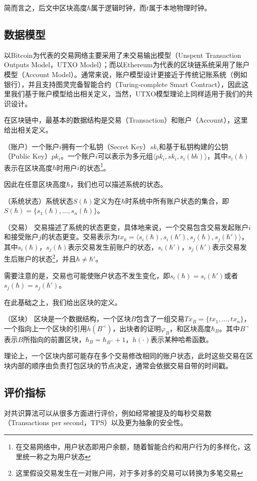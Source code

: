 简而言之，后文中区块高度$\hbar$属于逻辑时钟，而$t$属于本地物理时钟。

\subsection{数据模型}
以Bitcoin为代表的交易网络主要采用了未交易输出模型（Unspent Transaction Outputs Model，UTXO Model）；而以Ethereum为代表的区块链系统采用了账户模型（Account Model）。通常来说，账户模型设计更接近于传统记账系统（例如银行），并且支持图灵完备智能合约（Turing-complete Smart Contract），因此这里我们基于账户模型给出相关定义，当然，UTXO模型理论上同样适用于我们的共识设计。

在区块链中，最基本的数据结构是交易（Transaction）和账户（Account），这里给出相关定义。

\begin{definition}
（账户）一个账户$i$拥有一个私钥（Secret Key）$sk_i$和基于私钥构建的公钥（Public Key）$pk_i$。一个账户$i$可以表示为多元组$\langle pk_i,sk_i,s_i(bh)\rangle$，其中$s_i(\hbar)$表示在区块高度$\hbar$时用户$i$的状态\footnote{在交易网络中，用户状态即用户余额，随着智能合约和用户行为的多样化，这里统一称之为用户状态}。
\end{definition}

因此在任意区块高度$\hbar$，我们也可以描述系统的状态。

\begin{definition}
（系统状态）系统状态$S(\hbar)$定义为在$\hbar$时系统中所有账户状态的集合，即$S(\hbar)=\{s_1(\hbar),...,s_n(\hbar)\}$。
\end{definition}

\begin{definition}
（交易） 交易描述了系统的状态更变，具体地来说，一个交易包含交易发起账户$i$和接受账户$j$的状态更变。交易表示为$tx_k=\langle s_i(\hbar),s_i(\hbar'),s_j(\hbar),s_j(\hbar')\rangle$，其中$s_i(\hbar)$，$s_j(\hbar)$表示交易发生前账户的状态，$s_i(\hbar')$，$s_j(\hbar')$表示交易发生后账户的状态\footnote{这里假设交易发生在一对账户间，对于多对多的交易可以转换为多笔交易}，并且$\hbar \neq \hbar'$。
\end{definition}

需要注意的是，交易也可能使账户状态不发生变化，即$s_i(\hbar)=s_i(\hbar')$或者$s_j(\hbar)=s_j(\hbar')$。

在此基础之上，我们给出区块的定义。

\begin{definition}
\label{def:block}
（区块） 区块是一个数据结构，一个区块$B$包含了一组交易$Tx_B=\{tx_1,\dots,tx_n\}$，一个指向上一个区块的引用$h(B^{\prec})$，出块者的证明$\varphi_B$，和区块高度$\hbar_B$。其中$B^{\prec}$表示$B$所指向的前置区块，$\hbar_B=\hbar_{B^{\prec}}+1$，$h(\cdot)$表示某种哈希函数。
\end{definition}

理论上，一个区块内部可能存在多个交易修改相同的账户状态，此时这些交易在区块内部的顺序由负责打包区块的节点决定，通常会依据交易自带的时间戳。

\subsection{评价指标}
对共识算法可以从很多方面进行评价，例如经常被提及的每秒交易数（Transactions per second，TPS）以及更为抽象的安全性。

